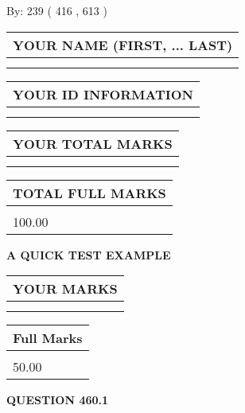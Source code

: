 \documentclass[12pt]{article}
\begin{document}
   
\hspace{1.0in} By: 
 239 ( 416 ,  613 )
   
   
   
   
\newpage 
\setcounter{page}{ 
   460001 } 
   
   
   
   
\noindent\begin{tabular}{|l|}
\hline
YOUR NAME (FIRST, ... LAST)  \\
\hline
 \\ 
 \\ 
\hline
\end{tabular}
\hspace{0.05in} \begin{tabular}{|l|}
\hline
 YOUR   ID   INFORMATION  \\
\hline
 \\ 
 \\ 
\hline
\end{tabular}
   
   
\vspace{0.2in}\noindent\begin{tabular}{|l|}
\hline
YOUR TOTAL MARKS  \\
\hline
 \\ 
 \\ 
\hline
\end{tabular}
\hspace{0.05in} \begin{tabular}{|l|}
\hline
TOTAL FULL MARKS  \\
\hline
 \\ 
100.00 \\
\hline
\end{tabular}
   
   
 \vspace{0.2in}
{\LARGE {\textbf{ A QUICK TEST EXAMPLE}}}
   
   
  
\vspace{0.2in}
  
\noindent\begin{tabular}{|l|}
\hline
 YOUR MARKS  \\
\hline
 \\ 
 \\ 
\hline
\end{tabular}
\hspace{0.05in} \begin{tabular}{|l|}
\hline
 Full Marks  \\
\hline
 \\ 
50.00 \\
\hline
\end{tabular}
{\textbf{\Large{QUESTION
460.1 
}}}
  
\end{document}
